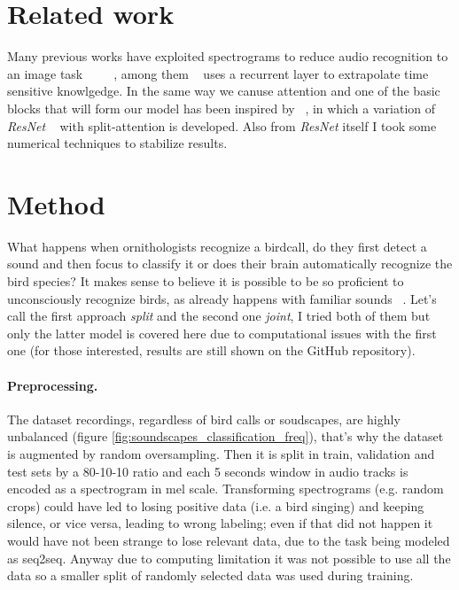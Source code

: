 \documentclass{article}
\begin{document}
\section{Related work}
Many previous works have exploited spectrograms to reduce audio recognition to an image task ~\cite{hamdyaudio} ~\cite{michelashvili2020denoising} ~\cite{xie2021audio}, among them ~\cite{xie2021audio} uses a recurrent layer to extrapolate time sensitive knowlgedge.
In the same way we canuse attention and one of the basic blocks that will form our model has been inspired by ~\cite{zhang2020resnest}, in which a variation of \textit{ResNet} ~\cite{he2016deep} with split-attention is developed.
Also from \textit{ResNet} itself I took some numerical techniques to stabilize results.

\section{Method}
What happens when ornithologists recognize a birdcall, do they first detect a sound and then focus to classify it or does their brain automatically recognize the bird species?
It makes sense to believe it is possible to be so proficient to unconsciously recognize birds, as already happens with familiar sounds ~\cite{kirmse2009familiarity}. 
Let's call the first approach \textit{split} and the second one \textit{joint}, I tried both of them but only the latter model is covered here due to computational issues with the first one (for those interested, results are still shown on the GitHub repository).

\paragraph*{Preprocessing.}
The dataset recordings, regardless of bird calls or soudscapes, are highly unbalanced (figure \ref{fig:soundscapes_classification_freq}), that's why the dataset is augmented by random oversampling.
Then it is split in train, validation and test sets by a 80-10-10 ratio and each 5 seconds window in audio tracks is encoded as a spectrogram in mel scale.
Transforming spectrograms (e.g. random crops) could have led to losing positive data (i.e. a bird singing) and keeping silence, or vice versa, leading to wrong labeling; even if that did not happen it would have not been strange to lose relevant data, due to the task being modeled as seq2seq.   
Anyway due to computing limitation it was not possible to use all the data so a smaller split of randomly selected data was used during training.
\end{document}
